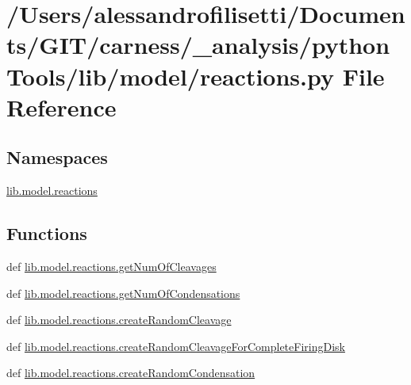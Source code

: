 \hypertarget{a00095}{\section{/\-Users/alessandrofilisetti/\-Documents/\-G\-I\-T/carness/\-\_\-analysis/python\-Tools/lib/model/reactions.py File Reference}
\label{a00095}
}
\subsection*{Namespaces}
\begin{DoxyCompactItemize}
\item 
\hyperlink{a00147}{lib.\-model.\-reactions}
\end{DoxyCompactItemize}
\subsection*{Functions}
\begin{DoxyCompactItemize}
\item 
def \hyperlink{a00147_a39866224c062e8fdc5905a4202d9e579}{lib.\-model.\-reactions.\-get\-Num\-Of\-Cleavages}
\item 
def \hyperlink{a00147_a8385f261f5039a8cfeefa089298872f3}{lib.\-model.\-reactions.\-get\-Num\-Of\-Condensations}
\item 
def \hyperlink{a00147_a2e361527fbcbb7ae4b02783df35d33ff}{lib.\-model.\-reactions.\-create\-Random\-Cleavage}
\item 
def \hyperlink{a00147_a5eb802389e0de8e036b9a38dfeb41c70}{lib.\-model.\-reactions.\-create\-Random\-Cleavage\-For\-Complete\-Firing\-Disk}
\item 
def \hyperlink{a00147_abc3efdd6ab0936972017dc010317bd3d}{lib.\-model.\-reactions.\-create\-Random\-Condensation}
\end{DoxyCompactItemize}
